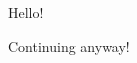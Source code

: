 \documentclass{article}
\begin{document}
Hello!
\nonexistingmacro

Continuing anyway!
\end{document}
